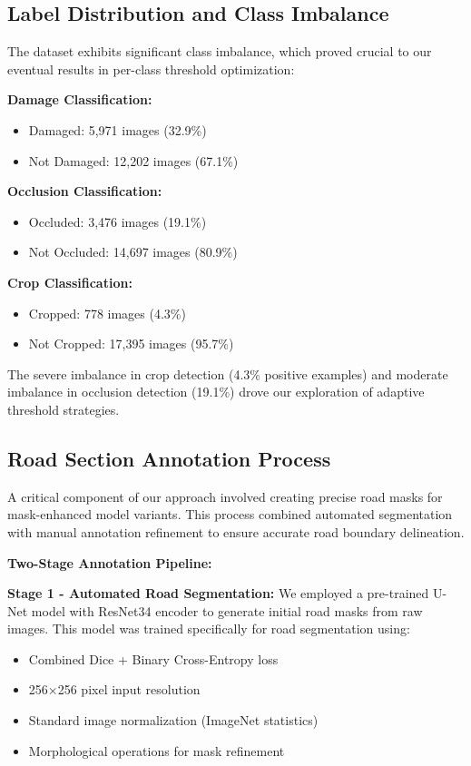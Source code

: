 \documentclass[12pt]{article}
\begin{document}
\subsection{Label Distribution and Class Imbalance}

The dataset exhibits significant class imbalance, which proved crucial to our eventual results in per-class threshold optimization:

\textbf{Damage Classification:}
\begin{itemize}[itemsep=1pt,parsep=0pt,topsep=2pt]
\item Damaged: 5,971 images (32.9\%)
\item Not Damaged: 12,202 images (67.1\%)
\end{itemize}

\textbf{Occlusion Classification:}
\begin{itemize}[itemsep=1pt,parsep=0pt,topsep=2pt]
\item Occluded: 3,476 images (19.1\%)
\item Not Occluded: 14,697 images (80.9\%)
\end{itemize}

\textbf{Crop Classification:}
\begin{itemize}[itemsep=1pt,parsep=0pt,topsep=2pt]
\item Cropped: 778 images (4.3\%)
\item Not Cropped: 17,395 images (95.7\%)
\end{itemize}

The severe imbalance in crop detection (4.3\% positive examples) and moderate imbalance in occlusion detection (19.1\%) drove our exploration of adaptive threshold strategies.

\subsection{Road Section Annotation Process}

A critical component of our approach involved creating precise road masks for mask-enhanced model variants. This process combined automated segmentation with manual annotation refinement to ensure accurate road boundary delineation.

\textbf{Two-Stage Annotation Pipeline:}

\textbf{Stage 1 - Automated Road Segmentation:} We employed a pre-trained U-Net model with ResNet34 encoder to generate initial road masks from raw images. This model was trained specifically for road segmentation using:
\begin{itemize}[itemsep=1pt,parsep=0pt,topsep=2pt]
\item Combined Dice + Binary Cross-Entropy loss
\item 256×256 pixel input resolution
\item Standard image normalization (ImageNet statistics)
\item Morphological operations for mask refinement
\end{itemize}
\end{document}
